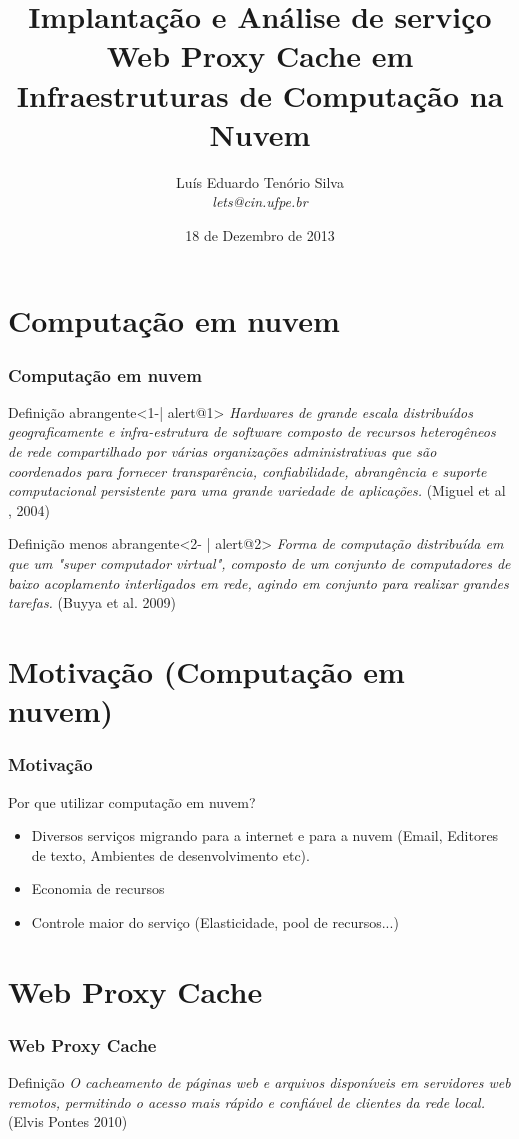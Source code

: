 \documentclass{beamer}
\title[TCC]{Implantação e Análise de serviço Web Proxy Cache em Infraestruturas de Computação na Nuvem}
\author{Luís Eduardo Tenório Silva\\\textit{lets@cin.ufpe.br}}
\date[18/12/13]{18 de Dezembro de 2013}
\begin{document}
    \frame{\titlepage}

    \frame{\tableofcontents}
    \section{Computação em nuvem}
    \begin{frame}
      \frametitle{Computação em nuvem}
      \begin{block}{Definição abrangente}<1-| alert@1>
      \textit{Hardwares de grande escala distribuídos geograficamente e infra-estrutura de software composto de recursos heterogêneos de rede compartilhado por várias organizações administrativas que são coordenados para fornecer transparência, confiabilidade, abrangência e suporte computacional persistente para uma grande variedade de aplicações.} (Miguel et
al , 2004)
    \end{block}    
    \begin{block}{Definição menos abrangente}<2- | alert@2>
      \textit{Forma de computação distribuída em que um "super computador virtual", composto de um conjunto de computadores de baixo
acoplamento interligados em rede, agindo em conjunto para realizar grandes tarefas.} (Buyya et al. 2009)
     \end{block}       
    \end{frame}
    \section{Motivação (Computação em nuvem)}
    \begin{frame}
      \frametitle{Motivação}
      Por que utilizar computação em nuvem?
      \begin{itemize}
       \item <2->Diversos serviços migrando para a internet e para a nuvem (Email, Editores de texto, Ambientes de desenvolvimento etc).
       \item <3->Economia de recursos
       \item <4->Controle maior do serviço (Elasticidade, pool de recursos...)
      \end{itemize}
    \end{frame}
    \section{Web Proxy Cache}
    \begin{frame}
      \frametitle{Web Proxy Cache}
      \begin{block}{Definição}
	\textit{O cacheamento de páginas web e arquivos disponíveis em servidores web remotos, permitindo o acesso mais rápido e
confiável de clientes da rede local.} (Elvis Pontes 2010)
      \end{block}
    \end{frame}
\end{document}
